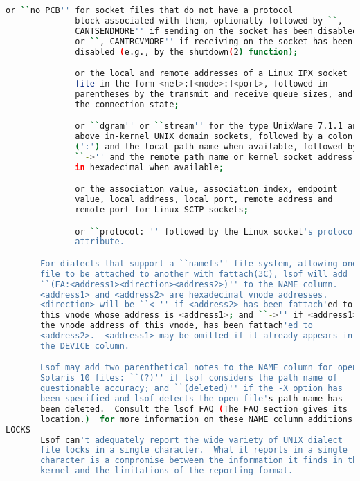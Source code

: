 {{\begin{lstlisting}[language=bash]
              or ``no PCB'' for socket files that do not have a protocol
              block associated with them, optionally followed by ``,
              CANTSENDMORE'' if sending on the socket has been disabled,
              or ``, CANTRCVMORE'' if receiving on the socket has been
              disabled (e.g., by the shutdown(2) function);

              or the local and remote addresses of a Linux IPX socket
              file in the form <net>:[<node>:]<port>, followed in
              parentheses by the transmit and receive queue sizes, and
              the connection state;

              or ``dgram'' or ``stream'' for the type UnixWare 7.1.1 and
              above in-kernel UNIX domain sockets, followed by a colon
              (':') and the local path name when available, followed by
              ``->'' and the remote path name or kernel socket address
              in hexadecimal when available;

              or the association value, association index, endpoint
              value, local address, local port, remote address and
              remote port for Linux SCTP sockets;

              or ``protocol: '' followed by the Linux socket's protocol
              attribute.

       For dialects that support a ``namefs'' file system, allowing one
       file to be attached to another with fattach(3C), lsof will add
       ``(FA:<address1><direction><address2>)'' to the NAME column.
       <address1> and <address2> are hexadecimal vnode addresses.
       <direction> will be ``<-'' if <address2> has been fattach'ed to
       this vnode whose address is <address1>; and ``->'' if <address1>,
       the vnode address of this vnode, has been fattach'ed to
       <address2>.  <address1> may be omitted if it already appears in
       the DEVICE column.

       Lsof may add two parenthetical notes to the NAME column for open
       Solaris 10 files: ``(?)'' if lsof considers the path name of
       questionable accuracy; and ``(deleted)'' if the -X option has
       been specified and lsof detects the open file's path name has
       been deleted.  Consult the lsof FAQ (The FAQ section gives its
       location.)  for more information on these NAME column additions.
LOCKS
       Lsof can't adequately report the wide variety of UNIX dialect
       file locks in a single character.  What it reports in a single
       character is a compromise between the information it finds in the
       kernel and the limitations of the reporting format.


\end{lstlisting}}}
